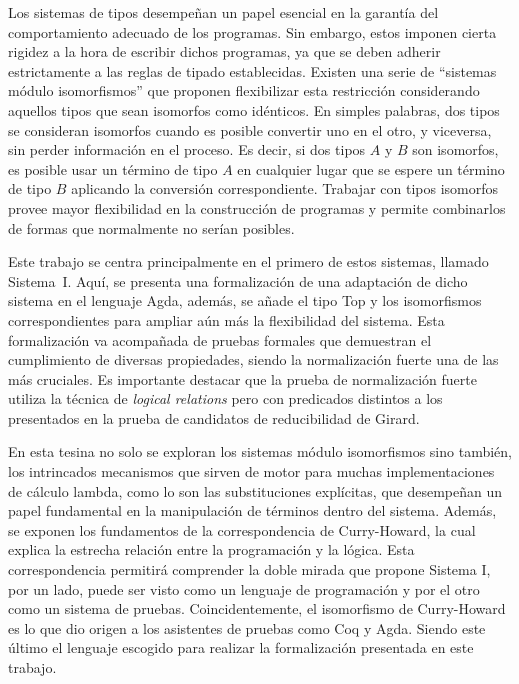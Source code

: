 Los sistemas de tipos desempeñan un papel esencial en la garantía del comportamiento adecuado de los programas.
Sin embargo, estos imponen cierta rigidez a la hora de escribir dichos programas, ya que se deben adherir estrictamente a las reglas de tipado establecidas.
Existen una serie de ``sistemas módulo isomorfismos'' \cite{system-i,extensional-proofs, dist-lambda,lambda-plus,sip,sip-paper} que proponen flexibilizar esta restricción considerando aquellos tipos que sean isomorfos como idénticos.
En simples palabras, dos tipos se consideran isomorfos cuando es posible convertir uno en el otro, y viceversa, sin perder información en el proceso.
Es decir, si dos tipos $A$ y $B$ son isomorfos, es posible usar un término de tipo $A$ en cualquier lugar que se espere un término de tipo $B$ aplicando la conversión correspondiente.
Trabajar con tipos isomorfos provee mayor flexibilidad en la construcción de programas y permite combinarlos de formas que normalmente no serían posibles.

Este trabajo se centra principalmente en el primero de estos sistemas, llamado Sistema~I.
Aquí, se presenta una formalización de una adaptación de dicho sistema en el lenguaje Agda, además, se añade el tipo Top y los isomorfismos correspondientes para ampliar aún más la flexibilidad del sistema.
Esta formalización va acompañada de pruebas formales que demuestran el cumplimiento de diversas propiedades, siendo la normalización fuerte una de las más cruciales.
Es importante destacar que la prueba de normalización fuerte utiliza la técnica de \textit{logical relations} pero con predicados distintos a los presentados en la prueba de candidatos de reducibilidad de Girard.

En esta tesina no solo se exploran los sistemas módulo isomorfismos sino también, los intrincados mecanismos que sirven de motor para muchas implementaciones de cálculo lambda, como lo son las substituciones explícitas, que desempeñan un papel fundamental en la manipulación de términos dentro del sistema.
Además, se exponen los fundamentos de la correspondencia de Curry-Howard, la cual explica la estrecha relación entre la programación y la lógica.
Esta correspondencia permitirá comprender la doble mirada que propone Sistema I, por un lado, puede ser visto como un lenguaje de programación y por el otro como un sistema de pruebas.
Coincidentemente, el isomorfismo de Curry-Howard es lo que dio origen a los asistentes de pruebas como Coq y Agda.
Siendo este último el lenguaje escogido para realizar la formalización presentada en este trabajo.